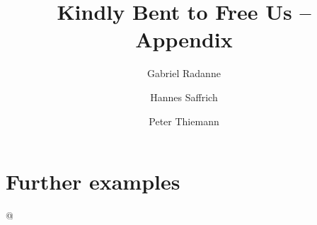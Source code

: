 \documentclass[acmsmall,screen]{acmart}
\author{Gabriel Radanne}
\affiliation{
  \institution{Inria}
  \country{Paris}
}
\author{Hannes Saffrich}
\affiliation{
  \institution{University of Freiburg}
  \country{Germany}
}
\author{Peter Thiemann}
\affiliation{
  \institution{University of Freiburg}
  \country{Germany}
}
\begin{document}
\title{Kindly Bent to Free Us -- Appendix}
\maketitle

\appendix

\section{Further examples}
\label{sec:extra-example}
\lstMakeShortInline[keepspaces,basicstyle=\small\ttfamily]@


\lstDeleteShortInline@


\clearpage

\clearpage




\end{document}
